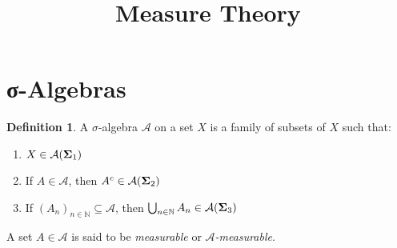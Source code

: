 \documentclass{article}
\title{\textbf{Measure Theory}\\[0.5em]}
\author{}
\date{}
\theoremstyle{definition}
\newtheorem{definition}{Definition}[section]
\begin{document}
\maketitle

\section{σ-Algebras}
\begin{definition}
A $\sigma$-algebra $\mathcal{A}$ on a set $X$ is a family of subsets of $X$ such that:
\begin{enumerate}
    \item $X \in \mathcal{A} \hfill \text{($\boldsymbol{\Sigma}_1$)}$
    \item If $A \in \mathcal{A}$, then $A^c \in \mathcal{A} \hfill \text{($\boldsymbol{\Sigma}_2$)}$
    \item If $(A_n)_{n \in \mathbb{N}} \subseteq \mathcal{A}$, then $\bigcup_{n \in \mathbb{N}} A_n \in \mathcal{A} \hfill \text{($\boldsymbol{\Sigma}_3$)}$
\end{enumerate}

\medskip

A set $A \in \mathcal{A}$ is said to be \textit{measurable} or \textit{$\mathcal{A}$-measurable}.
\end{definition}
\end{document}
